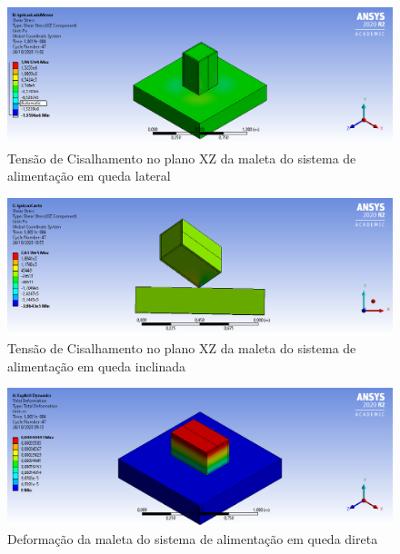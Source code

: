 \begin{apendicesenv}
\begin{figure}[htb]
    \centering
    \includegraphics[width=1.0\textwidth, angle=0]{figuras/estrutura_simulacaoImpacto/ignicaoCisalhamentoXZLadoMenor.png}
    \caption{Tensão de Cisalhamento no plano XZ da maleta do sistema de alimentação em queda lateral}
    \label{fig:simulacaoImpacto_05}
\end{figure}

\begin{figure}[htb]
    \centering
    \includegraphics[width=1.0\textwidth, angle=0]{figuras/estrutura_simulacaoImpacto/ignicaoCisalhamentoXZCanto.png}
    \caption{Tensão de Cisalhamento no plano XZ da maleta do sistema de alimentação em queda inclinada}
    \label{fig:simulacaoImpacto_06}
\end{figure}

\begin{figure}[htb]
    \centering
    \includegraphics[width=1.0\textwidth, angle=0]{figuras/estrutura_simulacaoImpacto/ignicaoDeformacaoLadoMaior.png}
    \caption{Deformação da maleta do sistema de alimentação em queda direta}
    \label{fig:simulacaoImpacto_07}
\end{figure}


\end{apendicesenv}
